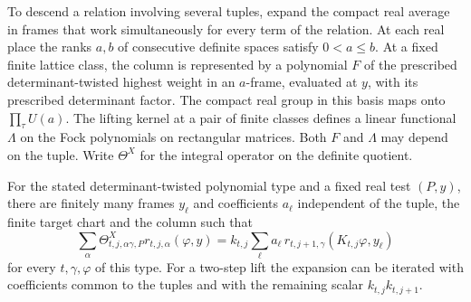 To descend a relation involving several tuples, expand the compact real average in frames that work simultaneously for every term of the relation.
At each real place the ranks \(a,b\) of consecutive definite
spaces satisfy \(0<a\le b\). At a fixed finite lattice class, the column is represented by a polynomial \(F\) of the prescribed
determinant-twisted highest weight in an \(a\)-frame, evaluated
at \(y\), with its prescribed determinant factor. The compact
real group in this basis maps onto \(\prod_\tau U(a)\). The
lifting kernel at a pair of finite classes defines a linear
functional \(\Lambda\) on the Fock polynomials on rectangular
matrices. Both \(F\) and \(\Lambda\) may depend on the tuple. Write
\(\Theta^X\) for the integral operator on the definite quotient.

\begin{lemma}\label{lem:common-definite-expansion}
For the stated determinant-twisted polynomial type and a fixed
real test \((P,y)\), there are finitely many frames \(y_\ell\) and
coefficients \(a_\ell\) independent of the tuple, the finite target
chart and the column such that
\begin{equation}\label{eq:uniform-frame}
 \sum_\alpha \Theta^{X}_{t,j,\alpha\gamma,P}
                   r_{t,j,\alpha}(\varphi,y)
   = k_{t,j}\sum_\ell a_\ell\,
                r_{t,j+1,\gamma}(K_{t,j}\varphi,y_\ell)
\end{equation}
for every \(t,\gamma,\varphi\) of this type. For a two-step lift the
expansion can be iterated with coefficients common to the tuples
and with the remaining scalar \(k_{t,j}k_{t,j+1}\).
\end{lemma}

